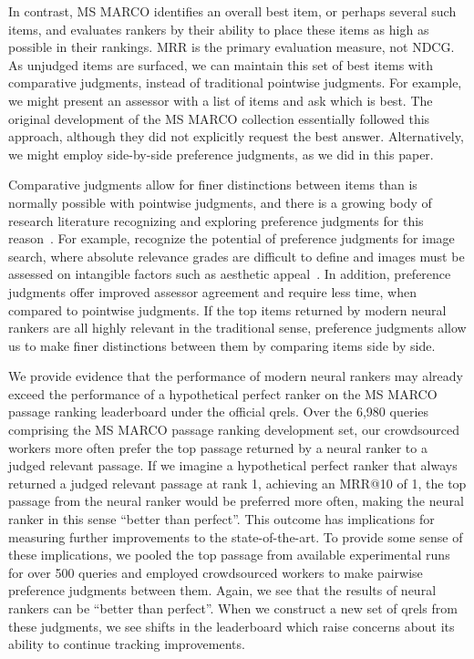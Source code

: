 \documentclass[fullpage]{article}
\begin{document}
In contrast, MS MARCO identifies an overall best item, or perhaps several such items, and evaluates rankers by their ability to place these items as high as possible in their rankings. MRR is the primary evaluation measure, not NDCG. As unjudged items are surfaced, we can maintain this set of best items with comparative judgments, instead of traditional pointwise judgments. For example, we might present an assessor with a list of items and ask which is best. The original development of the MS MARCO collection essentially followed this approach, although they did not explicitly request the best answer. Alternatively, we might employ side-by-side preference judgments, as we did in this paper.

Comparative judgments allow for finer distinctions between items than is normally possible with pointwise judgments, and there is a growing body of research literature recognizing and exploring preference judgments for this reason~\cite{sz20,zc10,cbcd08,ymt18}. For example, \citet{xie20} recognize the potential of preference judgments for image search, where absolute relevance grades are difficult to define and images must be assessed on intangible factors such as aesthetic appeal~\cite{shao19}. In addition, preference judgments offer improved assessor agreement and require less time, when compared to pointwise judgments. If the top items returned by modern neural rankers are all highly relevant in the traditional sense, preference judgments allow us to make finer distinctions between them by comparing items side by side.

We provide evidence that the performance of modern neural rankers may already exceed the performance of a hypothetical perfect ranker on the MS MARCO passage ranking leaderboard under the official qrels. Over the 6,980 queries comprising the MS MARCO passage ranking development set, our crowdsourced workers more often prefer the top passage returned by a neural ranker to a judged relevant passage. If we imagine a hypothetical perfect ranker that always returned a judged relevant passage at rank 1, achieving an MRR@10 of 1, the top passage from the neural ranker would be preferred more often, making the neural ranker in this sense ``better than perfect''.
This outcome has implications for measuring further improvements to the state-of-the-art. To provide some sense of these implications, we pooled the top passage from available experimental runs for over 500 queries and employed crowdsourced workers to make pairwise preference judgments between them. Again, we see that the results of neural rankers can be ``better than perfect''. When we construct a new set of qrels from these judgments, we see shifts in the leaderboard which raise concerns about its ability to continue tracking improvements.
\end{document}
